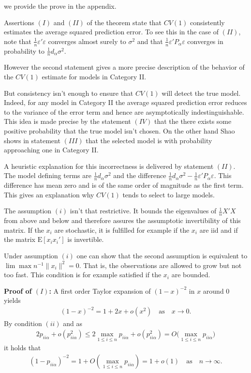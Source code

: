 \documentclass[Research_Module_ES.tex]{subfiles}
\begin{document}
we provide the prove in the appendix.\

Assertions $(I)$ and $(II)$ of the theorem state that $CV(1)$ consistently estimates the average squared prediction error. To see this in the case of $(II)$, note that $\frac{1}{n}\varepsilon'\varepsilon$ converges almost surely to $\sigma^2$ and that 
$\frac{1}{n}\varepsilon'P_\alpha\varepsilon$ converges in probability to $\frac{1}{n}d_\alpha\sigma^2$.\

However the second statement gives a more precise description of the behavior of the $CV(1)$ estimate for models in Category II. \

But consistency isn't enough to ensure that $CV(1)$ will detect the true model. Indeed, for any model in Category II the average squared prediction error reduces to the variance of the error term and hence are asymptotically indestinguishable. This idea is made precise by the statement $(IV)$ that the there exists some positive probability that the true model isn't chosen. On the other hand Shao shows in statement $(III)$ that the selected model is with probability approaching one in Category II.\

A heuristic explanation for this incorrectness is delivered by statement $(II)$. The model defining terms are $\frac{1}{n}d_\alpha\sigma^2$ and the difference $\frac{1}{n}d_\alpha\sigma^2 - \frac{1}{n}\varepsilon'P_\alpha\varepsilon$. This difference has mean zero and is of the same order of magnitude as the first term. This gives an explanation why $CV(1)$ tends to select to large models.\

The assumption $(i)$ isn't that restrictive. It bounds the eigenvalues of $\frac{1}{n}X'X$ from above and below and therefore assures the assumptotic invertibility of this matrix. If the $x_i$ are stochastic, it is fulfilled for example if the $x_i$ are iid and if the matrix $\mathrm{E}[x_ix_i']$ is invertible.\

Under assumption $(i)$ one can show that the second assumption is equivalent to $\lim \max n^{-1}\lVert x_i\rVert^2=0$. That is, the observations are allowed to grow but not too fast. This condition is for example satisfied if the $x_i$ are bounded.\

\textbf{Proof of $(I)$:} A first order Taylor expansion of $(1-x)^{-2}$ in $x$ around $0$ yields 
\begin{align*}
(1- x)^{-2} = 1+ 2 x + o(x^2) \quad \textrm{as} \quad x\to 0 .
\end{align*}
By condition $(ii)$ and as
\begin{align*}
2p_{ii\alpha} + o(p_{ii\alpha}^2) 
\le 2 \max_{1\le i \le n} p_{ii\alpha} +  o(p_{ii\alpha}^2) 
= O\bigl(\max _{1\le i \le n} p_{ii\alpha}\bigr)
\end{align*}
it holds that 
\begin{align*}
(1- p_{ii\alpha})^{-2} = 1+ O(\max _{1\le i \le n} p_{ii\alpha}) 
= 1 +o(1) \quad \textrm{as} \quad n \to \infty. 
\end{align*}
\end{document}
